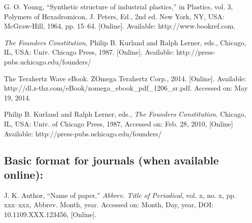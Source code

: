 \documentclass[12pt,conference]{IEEEtran}
\begin{document}
\begin{thebibliography}{34}
\setcounter{enumiv}{9}

\bibitem{}G. O. Young, ``Synthetic structure of industrial plastics,'' in Plastics, vol. 3, Polymers of Hexadromicon, J. Peters, Ed., 2nd ed. New York, NY, USA: McGraw-Hill, 1964, pp. 15--64. [Online]. Available: http://www.bookref.com. 

\bibitem{} {\em The Founders Constitution}, Philip B. Kurland and Ralph Lerner, eds., Chicago, IL, USA: Univ. Chicago Press, 1987. [Online]. Available: http://press-pubs.uchicago.edu/founders/

\bibitem{} The Terahertz Wave eBook. ZOmega Terahertz Corp., 2014. [Online]. Available: http://dl.z-thz.com/eBook/zomega\_ebook\_pdf\_1206\_sr.pdf. Accessed on: May 19, 2014. 

\bibitem{} Philip B. Kurland and Ralph Lerner, eds., {\em The Founders Constitution}. Chicago, IL, USA: Univ. of Chicago Press, 1987, Accessed on: Feb. 28, 2010, [Online] Available: http://press-pubs.uchicago.edu/founders/ 
\end{thebibliography}

\subsection*{Basic format for journals (when available online):}\vspace*{-12pt}
\begin{thebibliography}{34}
\item[] J. K. Author, ``Name of paper,'' {\em Abbrev. Title of Periodical}, vol. x, no. x, pp. xxx--xxx, Abbrev. Month, year. Accessed on: Month, Day, year, DOI: 10.1109.XXX.123456, [Online].
\end{thebibliography}
\end{document}
